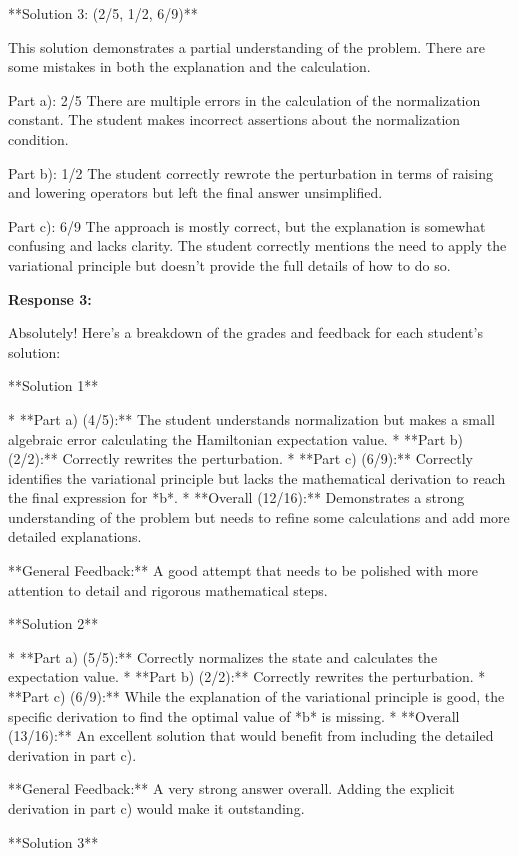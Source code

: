 \documentclass[a4paper,11pt]{article}
\begin{document}
**Solution 3: (2/5, 1/2, 6/9)**

This solution demonstrates a partial understanding of the problem. There are some mistakes in both the explanation and the calculation.

Part a): 2/5
There are multiple errors in the calculation of the normalization constant. The student makes incorrect assertions about the normalization condition.

Part b): 1/2
The student correctly rewrote the perturbation in terms of raising and lowering operators but left the final answer unsimplified.

Part c): 6/9
The approach is mostly correct, but the explanation is somewhat confusing and lacks clarity. The student correctly mentions the need to apply the variational principle but doesn't provide the full details of how to do so.

\bigskip    
\textbf{Response 3:}

Absolutely! Here's a breakdown of the grades and feedback for each student's solution:

**Solution 1**

*   **Part a) (4/5):** The student understands normalization but makes a small algebraic error calculating the Hamiltonian expectation value.
*   **Part b) (2/2):** Correctly rewrites the perturbation.
*   **Part c) (6/9):** Correctly identifies the variational principle but lacks the mathematical derivation to reach the final expression for *b*.
*   **Overall (12/16):** Demonstrates a strong understanding of the problem but needs to refine some calculations and add more detailed explanations.

**General Feedback:** A good attempt that needs to be polished with more attention to detail and rigorous mathematical steps.

**Solution 2**

*   **Part a) (5/5):** Correctly normalizes the state and calculates the expectation value.
*   **Part b) (2/2):** Correctly rewrites the perturbation.
*   **Part c) (6/9):**  While the explanation of the variational principle is good, the specific derivation to find the optimal value of *b* is missing.
*   **Overall (13/16):** An excellent solution that would benefit from including the detailed derivation in part c).

**General Feedback:** A very strong answer overall. Adding the explicit derivation in part c) would make it outstanding.

**Solution 3**
\end{document}
